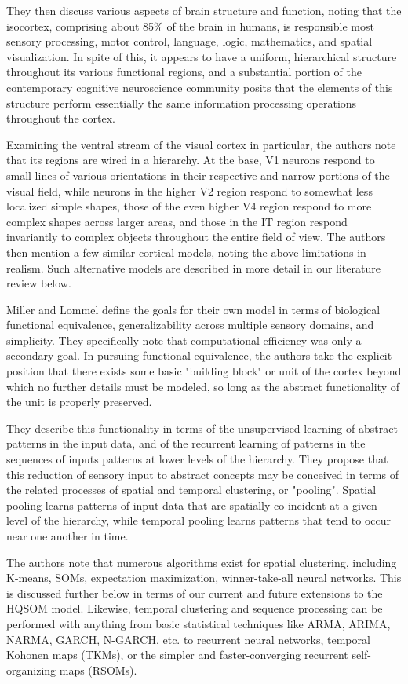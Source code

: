 \documentclass[a4paper,10pt]{article}
\begin{document}
They then discuss various aspects of brain structure and function, noting that the isocortex,
comprising about 85\% of the brain in humans, is responsible most sensory processing, motor control,
language, logic, mathematics, and spatial visualization. In spite of this, it appears to have a
uniform, hierarchical structure throughout its various functional regions, and a substantial portion
of the contemporary cognitive neuroscience community posits that the elements of this structure
perform essentially the same information processing operations throughout the cortex.

Examining the ventral stream of the visual cortex in particular, the authors note that its regions
are wired in a hierarchy. At the base, V1 neurons respond to small lines of various orientations in
their respective and narrow portions of the visual field, while neurons in the higher V2 region
respond to somewhat less localized simple shapes, those of the even higher V4 region respond to more
complex shapes across larger areas, and those in the IT region respond invariantly to complex
objects throughout the entire field of view. The authors then mention a few similar cortical models,
noting the above limitations in realism. Such alternative models are described in more detail in our
literature review below.

Miller and Lommel define the goals for their own model in terms of biological functional
equivalence, generalizability across multiple sensory domains, and simplicity. They specifically
note that computational efficiency was only a secondary goal. In pursuing functional equivalence,
the authors take the explicit position that there exists some basic "building block" or unit of the
cortex beyond which no further details must be modeled, so long as the abstract functionality of the
unit is properly preserved.

They describe this functionality in terms of the unsupervised learning of abstract patterns in the
input data, and of the recurrent learning of patterns in the sequences of inputs patterns at lower
levels of the hierarchy. They propose that this reduction of sensory input to abstract concepts may
be conceived in terms of the related processes of spatial and temporal clustering, or "pooling".
Spatial pooling learns patterns of input data that are spatially co-incident at a given level of the
hierarchy, while temporal pooling learns patterns that tend to occur near one another in time.

The authors note that numerous algorithms exist for spatial clustering, including K-means, SOMs,
expectation maximization, winner-take-all neural networks. This is discussed further below in terms
of our current and future extensions to the HQSOM model. Likewise, temporal clustering and sequence
processing can be performed with anything from basic statistical techniques like ARMA, ARIMA, NARMA,
GARCH, N-GARCH, etc. to recurrent neural networks, temporal Kohonen maps (TKMs), or the simpler and
faster-converging recurrent self-organizing maps (RSOMs).
\end{document}
